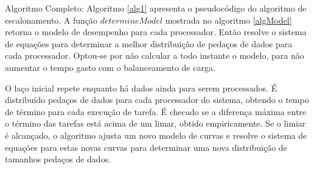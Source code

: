 Algoritmo Completo: Algoritmo \ref{alg1} apresenta o pseudocódigo do algoritmo de escalonamento. A função $determineModel$ mostrada no algoritmo \ref{algModel} retorna o modelo de desempenho para cada processador. Então resolve o sistema de equações para determinar a melhor distribuição de pedaços de dados para cada processador. Optou-se por não calcular a todo instante o modelo, para não aumentar o tempo gasto com o balanceamento de carga.

O laço inicial repete enquanto há dados ainda para serem processados. É distribuído pedaços de dados para cada processador do sistema, obtendo o tempo de término para cada execução de tarefa. É checado se a diferença máxima entre o término das tarefas está acima de um limar, obtido empiricamente. Se o limiar é alcançado, o algoritmo ajusta um novo modelo de curvas e resolve o sistema de equações para estas novas curvas para determinar uma nova distribuição de tamanhos pedaços de dados.

 
	











